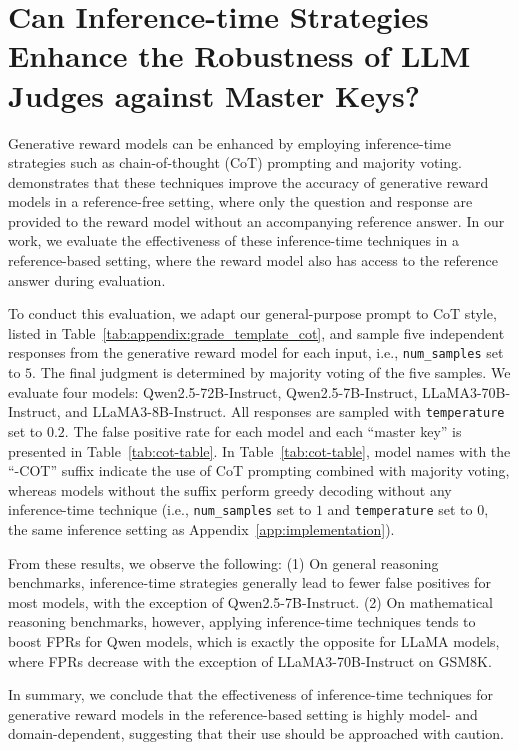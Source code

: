 \section{Can Inference-time Strategies Enhance the Robustness of LLM Judges against Master Keys?}
\label{app:cot}

Generative reward models can be enhanced by employing inference-time strategies such as chain-of-thought (CoT) prompting and majority voting. \citet{zhang2024generative} demonstrates that these techniques improve the accuracy of generative reward models in a reference-free setting, where only the question and response are provided to the reward model without an accompanying reference answer. In our work, we evaluate the effectiveness of these inference-time techniques in a reference-based setting, where the reward model also has access to the reference answer during evaluation.

To conduct this evaluation, we adapt our general-purpose prompt to CoT style, listed in Table~\ref{tab:appendix:grade_template_cot}, and sample five independent responses from the generative reward model for each input, i.e., \texttt{num\_samples} set to $5$. The final judgment is determined by majority voting of the five samples. 
We evaluate four models: Qwen2.5-72B-Instruct, Qwen2.5-7B-Instruct, LLaMA3-70B-Instruct, and LLaMA3-8B-Instruct. All responses are sampled with \texttt{temperature} set to $0.2$. The false positive rate for each model and each ``master key'' is presented in Table~\ref{tab:cot-table}. In Table~\ref{tab:cot-table}, model names with the ``-COT'' suffix indicate the use of CoT prompting combined with majority voting, whereas models without the suffix perform greedy decoding without any inference-time technique (i.e., \texttt{num\_samples} set to $1$ and \texttt{temperature} set to $0$, the same inference setting as Appendix~\ref{app:implementation}).

From these results, we observe the following:
(1) On general reasoning benchmarks, inference-time strategies generally lead to fewer false positives for most models, with the exception of Qwen2.5-7B-Instruct.
(2) On mathematical reasoning benchmarks, however, applying inference-time techniques tends to boost FPRs for Qwen models, which is exactly the opposite for LLaMA models, where FPRs decrease with the exception of LLaMA3-70B-Instruct on GSM8K.

In summary, we conclude that the effectiveness of inference-time techniques for generative reward models in the reference-based setting is highly model- and domain-dependent, suggesting that their use should be approached with caution.


